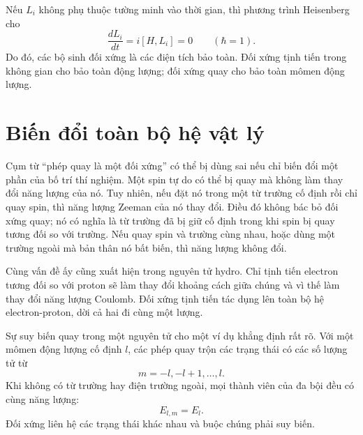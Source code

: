 Nếu \(L_i\) không phụ thuộc tường minh vào thời gian, thì phương trình Heisenberg cho
\begin{equation}
\frac{dL_i}{dt}
=i[H,L_i]=0
\qquad(\hbar=1).
\end{equation}
Do đó, các bộ sinh đối xứng là các điện tích bảo toàn. Đối xứng tịnh tiến trong không gian cho bảo toàn động lượng; đối xứng quay cho bảo toàn mômen động lượng. 

\section{Biến đổi toàn bộ hệ vật lý}

Cụm từ “phép quay là một đối xứng” có thể bị dùng sai nếu chỉ biến đổi một phần của bố trí thí nghiệm. Một spin tự do có thể bị quay mà không làm thay đổi năng lượng của nó. Tuy nhiên, nếu đặt nó trong một từ trường cố định rồi chỉ quay spin, thì năng lượng Zeeman của nó thay đổi. Điều đó không bác bỏ đối xứng quay; nó có nghĩa là từ trường đã bị giữ cố định trong khi spin bị quay tương đối so với trường. Nếu quay spin và trường cùng nhau, hoặc dùng một trường ngoài mà bản thân nó bất biến, thì năng lượng không đổi.

Cùng vấn đề ấy cũng xuất hiện trong nguyên tử hydro. Chỉ tịnh tiến electron tương đối so với proton sẽ làm thay đổi khoảng cách giữa chúng và vì thế làm thay đổi năng lượng Coulomb. Đối xứng tịnh tiến tác dụng lên toàn bộ hệ electron-proton, dời cả hai đi cùng một lượng.

\begin{classroomqa}
\end{classroomqa}

Sự suy biến quay trong một nguyên tử cho một ví dụ khẳng định rất rõ. Với một mômen động lượng cố định \(l\), các phép quay trộn các trạng thái có các số lượng tử từ
\begin{equation}
m=-l,-l+1,\ldots,l.
\end{equation}
Khi không có từ trường hay điện trường ngoài, mọi thành viên của đa bội đều có cùng năng lượng:
\begin{equation}
E_{l,m}=E_l.
\end{equation}
Đối xứng liên hệ các trạng thái khác nhau và buộc chúng phải suy biến.

